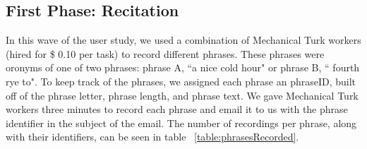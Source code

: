 \subsection{First Phase: Recitation}
\label{subsection:firstWaveUserStudy}
In this wave of the user study, we used a combination of \uniqueUsersPhaseOneUserStudy Mechanical Turk workers (hired for \$ 0.10 per task) to record \numResponsesPhaseOneUserStudy different phrases.  These phrases were oronyms of one of two phrases: phrase A, ``a nice cold hour" or phrase B, `` fourth rye to".  To keep track of the phrases, we assigned each phrase an phraseID, built off of the phrase letter, phrase length, and phrase text.    We gave Mechanical Turk workers three minutes to record each phrase and email it to us with the phrase identifier in the subject of the email. The number of recordings per phrase, along with their identifiers, can be seen in table ~\ref{table:phrasesRecorded}.


